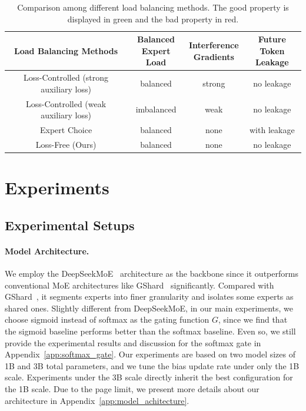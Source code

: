 \documentclass{article}
\begin{document}
\begin{table}[t]
\caption{Comparison among different load balancing methods. The good property is displayed in \textcolor{ddmgreen}{green} and the bad property in \textcolor{ddmred}{red}.}
\label{tab:comparison_load_control_methods}
\begin{center}
\begin{tabular}{c|c|c|c}
\toprule
\textbf{Load Balancing Methods} & \makecell{\textbf{Balanced} \\ \textbf{Expert Load}} & \makecell{\textbf{Interference} \\ \textbf{Gradients}} & \makecell{\textbf{Future Token} \\ \textbf{Leakage}}\\
\midrule
Loss-Controlled (strong auxiliary loss) & \textcolor{ddmgreen}{balanced} & \textcolor{ddmred}{strong} & \textcolor{ddmgreen}{no leakage} \\
Loss-Controlled (weak auxiliary loss) & \textcolor{ddmred}{imbalanced} & \textcolor{ddmgreen}{weak} & \textcolor{ddmgreen}{no leakage} \\
Expert Choice & \textcolor{ddmgreen}{balanced}  & \textcolor{ddmgreen}{none} & \textcolor{ddmred}{with leakage} \\
\midrule
Loss-Free (Ours) & \textcolor{ddmgreen}{balanced} & \textcolor{ddmgreen}{none} & \textcolor{ddmgreen}{no leakage} \\ 
\bottomrule
\end{tabular}
\end{center}
\end{table}

\section{Experiments}

\subsection{Experimental Setups}

\paragraph{Model Architecture.}
\label{par:model_architecture}
We employ the DeepSeekMoE~\citep{Dai2024DeepSeekMoETU} architecture as the backbone since it outperforms conventional MoE architectures like GShard~\citep{Lepikhin2020GShardSG} significantly. 
Compared with GShard~\citep{Lepikhin2020GShardSG}, it segments experts into finer granularity and isolates some experts as shared ones. 
Slightly different from DeepSeekMoE, in our main experiments, we choose sigmoid instead of softmax as the gating function $G$, since we find that the sigmoid baseline performs better than the softmax baseline. 
Even so, we still provide the experimental results and discussion for the softmax gate in Appendix~\ref{app:softmax_gate}.
Our experiments are based on two model sizes of 1B and 3B total parameters, and we tune the bias update rate under only the 1B scale. 
Experiments under the 3B scale directly inherit the best configuration for the 1B scale. 
Due to the page limit, we present more details about our architecture in Appendix~\ref{app:model_achitecture}. 
\end{document}
